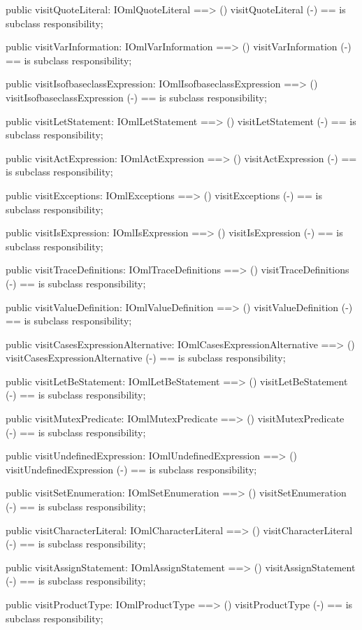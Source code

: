 \begin{vdm_al}
  public visitQuoteLiteral: IOmlQuoteLiteral ==> ()
  visitQuoteLiteral (-) == is subclass responsibility;

  public visitVarInformation: IOmlVarInformation ==> ()
  visitVarInformation (-) == is subclass responsibility;

  public visitIsofbaseclassExpression: IOmlIsofbaseclassExpression ==> ()
  visitIsofbaseclassExpression (-) == is subclass responsibility;

  public visitLetStatement: IOmlLetStatement ==> ()
  visitLetStatement (-) == is subclass responsibility;

  public visitActExpression: IOmlActExpression ==> ()
  visitActExpression (-) == is subclass responsibility;

  public visitExceptions: IOmlExceptions ==> ()
  visitExceptions (-) == is subclass responsibility;

  public visitIsExpression: IOmlIsExpression ==> ()
  visitIsExpression (-) == is subclass responsibility;

  public visitTraceDefinitions: IOmlTraceDefinitions ==> ()
  visitTraceDefinitions (-) == is subclass responsibility;

  public visitValueDefinition: IOmlValueDefinition ==> ()
  visitValueDefinition (-) == is subclass responsibility;

  public visitCasesExpressionAlternative: IOmlCasesExpressionAlternative ==> ()
  visitCasesExpressionAlternative (-) == is subclass responsibility;

  public visitLetBeStatement: IOmlLetBeStatement ==> ()
  visitLetBeStatement (-) == is subclass responsibility;

  public visitMutexPredicate: IOmlMutexPredicate ==> ()
  visitMutexPredicate (-) == is subclass responsibility;

  public visitUndefinedExpression: IOmlUndefinedExpression ==> ()
  visitUndefinedExpression (-) == is subclass responsibility;

  public visitSetEnumeration: IOmlSetEnumeration ==> ()
  visitSetEnumeration (-) == is subclass responsibility;

  public visitCharacterLiteral: IOmlCharacterLiteral ==> ()
  visitCharacterLiteral (-) == is subclass responsibility;

  public visitAssignStatement: IOmlAssignStatement ==> ()
  visitAssignStatement (-) == is subclass responsibility;

  public visitProductType: IOmlProductType ==> ()
  visitProductType (-) == is subclass responsibility;


\end{vdm_al}
